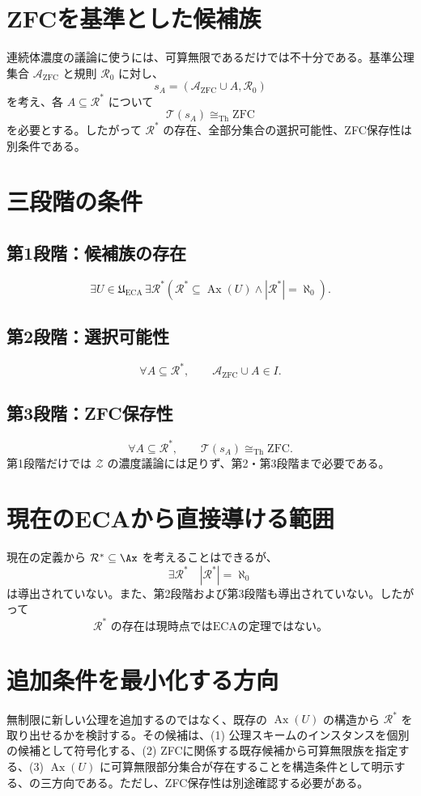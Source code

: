 \documentclass[11pt,a4paper]{article}
\begin{document}
\section{ZFCを基準とした候補族}
連続体濃度の議論に使うには、可算無限であるだけでは不十分である。基準公理集合 $\mathcal A_{\mathrm{ZFC}}$ と規則 $\mathcal R_0$ に対し、
\[
s_A=(\mathcal A_{\mathrm{ZFC}}\cup A,\mathcal R_0)
\]
を考え、各 $A\subseteq\mathcal R^*$ について
\[
\mathcal T(s_A)\cong_{\mathrm{Th}}\mathrm{ZFC}
\]
を必要とする。したがって $\mathcal R^*$ の存在、全部分集合の選択可能性、ZFC保存性は別条件である。

\section{三段階の条件}
\subsection*{第1段階：候補族の存在}
\[
\exists U\in\mathfrak U_{\mathrm{ECA}}\,\exists\mathcal R^*
\left(\mathcal R^*\subseteq\operatorname{Ax}(U)\land|\mathcal R^*|=\aleph_0\right).
\]
\subsection*{第2段階：選択可能性}
\[
\forall A\subseteq\mathcal R^*,\qquad \mathcal A_{\mathrm{ZFC}}\cup A\in I.
\]
\subsection*{第3段階：ZFC保存性}
\[
\forall A\subseteq\mathcal R^*,\qquad \mathcal T(s_A)\cong_{\mathrm{Th}}\mathrm{ZFC}.
\]
第1段階だけでは $\mathcal Z$ の濃度議論には足りず、第2・第3段階まで必要である。

\section{現在のECAから直接導ける範囲}
現在の定義から $\mathcal R^*\subseteq\Ax$ を考えることはできるが、
\[
\exists\mathcal R^*\quad |\mathcal R^*|=\aleph_0
\]
は導出されていない。また、第2段階および第3段階も導出されていない。したがって
\[
\boxed{\mathcal R^*\text{ の存在は現時点ではECAの定理ではない。}}
\]

\section{追加条件を最小化する方向}
無制限に新しい公理を追加するのではなく、既存の $\operatorname{Ax}(U)$ の構造から $\mathcal R^*$ を取り出せるかを検討する。その候補は、(1) 公理スキームのインスタンスを個別の候補として符号化する、(2) ZFCに関係する既存候補から可算無限族を指定する、(3) $\operatorname{Ax}(U)$ に可算無限部分集合が存在することを構造条件として明示する、の三方向である。ただし、ZFC保存性は別途確認する必要がある。
\end{document}
